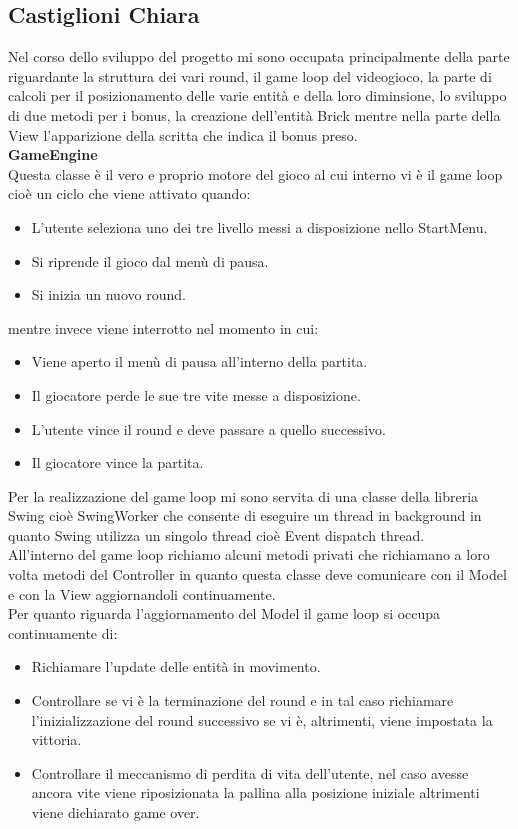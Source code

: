 \documentclass[a4paper,12pt]{report}
\begin{document}
\pagebreak
\subsection{Castiglioni Chiara}
Nel corso dello sviluppo del progetto mi sono occupata principalmente della parte riguardante la struttura dei vari round, il game loop del videogioco,
la parte di calcoli per il posizionamento delle varie entità e della loro diminsione, lo sviluppo di due metodi per i bonus, la creazione dell'entità Brick
mentre nella parte della View l'apparizione della scritta che indica il bonus preso.\\
\textbf{GameEngine}
\\Questa classe è il vero e proprio motore del gioco al cui interno vi è il game loop cioè un ciclo che viene attivato quando:
\begin{itemize}
    \item L'utente seleziona uno dei tre livello messi a disposizione nello StartMenu.
    \item Si riprende il gioco dal menù di pausa.
    \item Si inizia un nuovo round.
\end{itemize}
mentre invece viene interrotto nel momento in cui:
\begin{itemize}
    \item Viene aperto il menù di pausa all'interno della partita.
    \item Il giocatore perde le sue tre vite messe a disposizione.
    \item L'utente vince il round e deve passare a quello successivo.
    \item Il giocatore vince la partita.
\end{itemize}
Per la realizzazione del game loop mi sono servita di una classe della libreria Swing cioè SwingWorker che consente di eseguire un thread in background
in quanto Swing utilizza un singolo thread cioè Event dispatch thread.
\\All'interno del game loop richiamo alcuni metodi privati che richiamano a loro volta metodi del Controller in quanto questa classe deve comunicare con il Model
e con la View aggiornandoli continuamente.
\\Per quanto riguarda l'aggiornamento del Model il game loop si occupa continuamente di:
\begin{itemize}
    \item Richiamare l'update delle entità in movimento.
    \item Controllare se vi è la terminazione del round e in tal caso richiamare l'inizializzazione del round successivo se vi è, altrimenti, viene impostata la vittoria.
    \item Controllare il meccanismo di perdita di vita dell'utente, nel caso avesse ancora vite viene riposizionata la pallina alla posizione iniziale altrimenti viene dichiarato game over.
\end{itemize}
\end{document}

